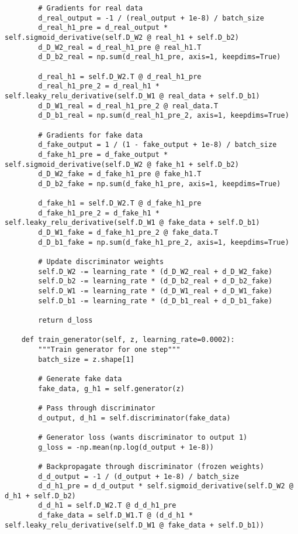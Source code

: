 ﻿\documentclass[12pt,a4paper]{article}
\begin{document}
\begin{lstlisting}
        # Gradients for real data
        d_real_output = -1 / (real_output + 1e-8) / batch_size
        d_real_h1_pre = d_real_output * self.sigmoid_derivative(self.D_W2 @ real_h1 + self.D_b2)
        d_D_W2_real = d_real_h1_pre @ real_h1.T
        d_D_b2_real = np.sum(d_real_h1_pre, axis=1, keepdims=True)
        
        d_real_h1 = self.D_W2.T @ d_real_h1_pre
        d_real_h1_pre_2 = d_real_h1 * self.leaky_relu_derivative(self.D_W1 @ real_data + self.D_b1)
        d_D_W1_real = d_real_h1_pre_2 @ real_data.T
        d_D_b1_real = np.sum(d_real_h1_pre_2, axis=1, keepdims=True)
        
        # Gradients for fake data
        d_fake_output = 1 / (1 - fake_output + 1e-8) / batch_size
        d_fake_h1_pre = d_fake_output * self.sigmoid_derivative(self.D_W2 @ fake_h1 + self.D_b2)
        d_D_W2_fake = d_fake_h1_pre @ fake_h1.T
        d_D_b2_fake = np.sum(d_fake_h1_pre, axis=1, keepdims=True)
        
        d_fake_h1 = self.D_W2.T @ d_fake_h1_pre
        d_fake_h1_pre_2 = d_fake_h1 * self.leaky_relu_derivative(self.D_W1 @ fake_data + self.D_b1)
        d_D_W1_fake = d_fake_h1_pre_2 @ fake_data.T
        d_D_b1_fake = np.sum(d_fake_h1_pre_2, axis=1, keepdims=True)
        
        # Update discriminator weights
        self.D_W2 -= learning_rate * (d_D_W2_real + d_D_W2_fake)
        self.D_b2 -= learning_rate * (d_D_b2_real + d_D_b2_fake)
        self.D_W1 -= learning_rate * (d_D_W1_real + d_D_W1_fake)
        self.D_b1 -= learning_rate * (d_D_b1_real + d_D_b1_fake)
        
        return d_loss
    
    def train_generator(self, z, learning_rate=0.0002):
        """Train generator for one step"""
        batch_size = z.shape[1]
        
        # Generate fake data
        fake_data, g_h1 = self.generator(z)
        
        # Pass through discriminator
        d_output, d_h1 = self.discriminator(fake_data)
        
        # Generator loss (wants discriminator to output 1)
        g_loss = -np.mean(np.log(d_output + 1e-8))
        
        # Backpropagate through discriminator (frozen weights)
        d_d_output = -1 / (d_output + 1e-8) / batch_size
        d_d_h1_pre = d_d_output * self.sigmoid_derivative(self.D_W2 @ d_h1 + self.D_b2)
        d_d_h1 = self.D_W2.T @ d_d_h1_pre
        d_fake_data = self.D_W1.T @ (d_d_h1 * self.leaky_relu_derivative(self.D_W1 @ fake_data + self.D_b1))
        

\end{lstlisting}
\end{document}
